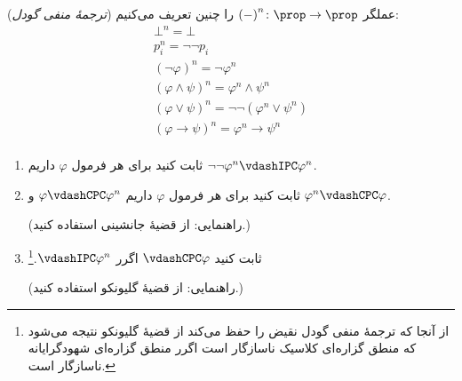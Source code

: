 (\emph{ترجمهٔ منفی گودل})
عملگر
$\mathord{(-)}^n\colon\prop\to\prop$
را چنین تعریف می‌کنیم:
\begin{gather*}
    \bot^n=\bot\\
    p_i^n=\neg\neg p_i\\
    (\neg\varphi)^n=\neg\varphi^n\\
    (\varphi\wedge\psi)^n=\varphi^n\wedge\psi^n\\
    (\varphi\vee\psi)^n=\neg\neg(\varphi^n\vee\psi^n)\\
    (\varphi\to\psi)^n=\varphi^n\to\psi^n\\
\end{gather*}\quad\vspace{-1.5cm}
\begin{enumerate}[label=(\alph*)]
    \item ثابت کنید برای هر فرمول
        $\varphi$
        داریم
        $\neg\neg\varphi^n\vdashIPC\varphi^n$.
    \item ثابت کنید برای هر فرمول
        $\varphi$
        داریم
        $\varphi\vdashCPC\varphi^n$
        و
        $\varphi^n\vdashCPC\varphi$.
        
        (راهنمایی: از قضیهٔ جانشینی استفاده کنید.)
    \item ثابت کنید
        $\vdashCPC\varphi$
        اگرر
        $\vdashIPC\varphi^n$.\footnote{
            از آنجا که ترجمهٔ منفی گودل نقیض را حفظ می‌کند از قضیهٔ گلیونکو نتیجه می‌شود که منطق گزاره‌ای کلاسیک ناسازگار است اگرر منطق گزاره‌ای شهودگرایانه ناسازگار است.
        }
        
        (راهنمایی: از قضیهٔ گلیونکو استفاده کنید.)
\end{enumerate}